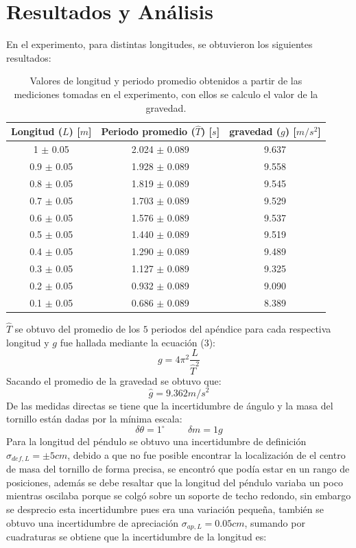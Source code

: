 \documentclass[DIV=calc, paper=a4, fontsize=11pt]{scrartcl}
\begin{document}

\section*{\textcolor{carmine}{Resultados y Análisis}}
En el experimento, para distintas longitudes, se obtuvieron los siguientes resultados:

\begin{table}[h!]
\centering
\begin{tabular}{||c|c|c||} 
 \hline
 Longitud ($L$) [$m$] & Periodo promedio ($\hat{T}$) [$s$] & gravedad ($g$) [$m/s^2$] \\ [0.5ex] 
 \hline\hline
 1 $\pm$ 0.05 & 2.024 $\pm$ 0.089  & 9.637 \\ 
 0.9 $\pm$ 0.05 &  1.928 $\pm$ 0.089 & 9.558 \\
 0.8 $\pm$ 0.05 & 1.819 $\pm$ 0.089 & 9.545 \\
 0.7 $\pm$ 0.05 &  1.703 $\pm$ 0.089 & 9.529 \\
 0.6 $\pm$ 0.05 &  1.576 $\pm$ 0.089 & 9.537 \\
 0.5 $\pm$ 0.05 & 1.440 $\pm$ 0.089 & 9.519 \\
 0.4 $\pm$ 0.05 & 1.290 $\pm$ 0.089 & 9.489 \\
 0.3 $\pm$ 0.05 & 1.127 $\pm$ 0.089 & 9.325 \\
 0.2 $\pm$ 0.05 & 0.932 $\pm$ 0.089 & 9.090 \\
 0.1 $\pm$ 0.05 & 0.686 $\pm$ 0.089 & 8.389 \\
  [1ex] 
 \hline
\end{tabular}
\caption{Valores de longitud y periodo promedio obtenidos a partir de las mediciones tomadas en el experimento, con ellos se calculo el valor de la gravedad.}
\label{table:1}
\end{table}

$\hat{T}$ se obtuvo del promedio de los $5$ periodos del apéndice para cada respectiva longitud y  $g$ fue hallada mediante la ecuación (3):
$$g=4\pi^2 \frac{L}{\hat{T}^2}$$
Sacando el promedio de la gravedad se obtuvo que:
$$\hat{g}=9.362m/s^2$$
De las medidas directas se tiene que la incertidumbre de ángulo y la masa del tornillo están dadas por la mínima escala:
\begin{equation*}
    \delta\theta =   1 ^{\circ} \hspace{1cm} \delta m =  1g
\end{equation*}
Para la longitud del péndulo se obtuvo una incertidumbre de definición $\sigma_{def, L}= \pm 5cm$,  debido a que no fue posible encontrar la localización de el centro de masa del tornillo de forma precisa, se encontró que podía estar en un rango de posiciones, además se debe resaltar que la longitud del péndulo variaba un poco mientras oscilaba porque se colgó sobre un soporte de techo redondo, sin embargo se desprecio esta incertidumbre pues era una variación pequeña, también se obtuvo una incertidumbre de apreciación  $\sigma_{ap, L}= 0.05cm$, sumando por cuadraturas se obtiene que la incertidumbre de la longitud es:
\end{document}
